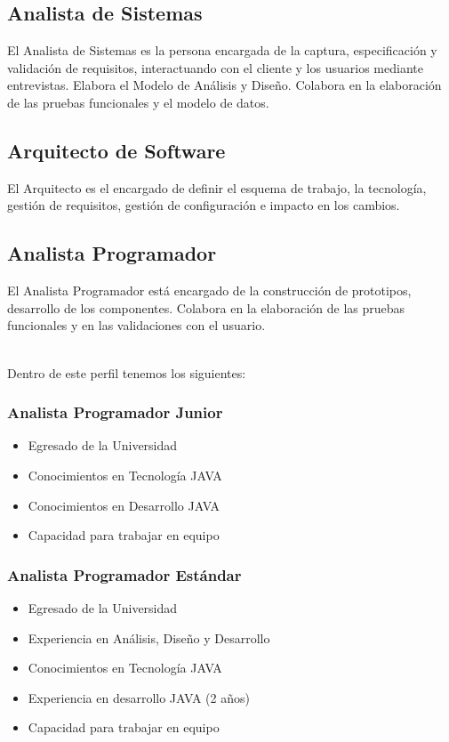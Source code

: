 	\subsection{Analista de Sistemas}
		El Analista de Sistemas es la persona encargada de la captura, especificación y
		validación de requisitos, interactuando con el cliente y los usuarios mediante
		entrevistas. Elabora el Modelo de Análisis y Diseño. Colabora en la elaboración
		de las pruebas funcionales y el modelo de datos.
		
	\subsection{Arquitecto de Software}
		El Arquitecto es el encargado de definir el esquema de trabajo, la
		tecnología, gestión de requisitos, gestión de configuración e impacto en los
		cambios.
		
	\subsection{Analista Programador}
		El Analista Programador está encargado de la construcción de prototipos,
		desarrollo de los componentes. Colabora en la elaboración de las pruebas
		funcionales y en las validaciones con el usuario.\\\
		
		Dentro de este perfil tenemos los siguientes:
		
		\subsubsection{Analista Programador Junior}
			\begin{itemize}
				\item Egresado de la Universidad
				\item Conocimientos en Tecnología JAVA
				\item Conocimientos en Desarrollo JAVA
				\item Capacidad para trabajar en equipo
			\end{itemize}
			
		\subsubsection{Analista Programador Estándar}
			\begin{itemize}
				\item Egresado de la Universidad
				\item Experiencia en Análisis, Diseño y Desarrollo
				\item Conocimientos en Tecnología JAVA
				\item Experiencia en desarrollo JAVA (2 años)
				\item Capacidad para trabajar en equipo
			\end{itemize}
			
